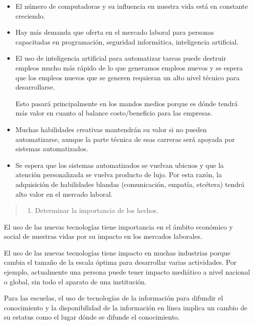 \documentclass[
  12,
]{scrartcl}
\providecommand{\tightlist}{%
  \setlength{\itemsep}{0pt}\setlength{\parskip}{0pt}}
\begin{document}
\begin{itemize}
\item
  El número de computadoras y su influencia en nuestra vida está en
  constante creciendo.
\item
  Hay más demanda que oferta en el mercado laboral para personas
  capacitadas en programación, seguridad informática, inteligencia
  artificial.
\item
  El uso de inteligencia artificial para automatizar tareas puede
  destruir empleos mucho más rápido de lo que generamos empleos nuevos y
  se espera que los empleos nuevos que se generen requieran un alto
  nivel técnico para desarrollarse.

  Esto pasará principalmente en los mandos medios porque es dónde tendrá
  más valor en cuanto al balance costo/beneficio para las empresas.
\item
  Muchas habilidades creativas mantendrán su valor si no pueden
  automatizarse, aunque la parte técnica de esas carreras será apoyada
  por sistemas automatizados.
\item
  Se espera que los sistemas automatizados se vuelvan ubicuos y que la
  atención personalizada se vuelva producto de lujo. Por esta razón, la
  adquisición de habilidades blandas (comunicación, empatía, etcétera)
  tendrá alto valor en el mercado laboral.
\end{itemize}

\begin{quote}
\begin{enumerate}
\def\labelenumi{\arabic{enumi}.}
\setcounter{enumi}{1}
\tightlist
\item
  Determinar la importancia de los hechos.
\end{enumerate}
\end{quote}

El uso de las nuevas tecnologías tiene importancia en el ámbito
económico y social de nuestras vidas por su impacto en los mercados
laborales.

El uso de las nuevas tecnologías tiene impacto en muchas industrias
porque cambia el tamaño de la escala óptima para desarrollar varias
actividades. Por ejemplo, actualmente una persona puede tener impacto
mediático a nivel nacional o global, sin todo el aparato de una
institución.

Para las escuelas, el uso de tecnologías de la información para difundir
el conocimiento y la disponibilidad de la información en línea implica
un cambio de su estatus como el lugar dónde se difunde el conocimiento.
\end{document}
